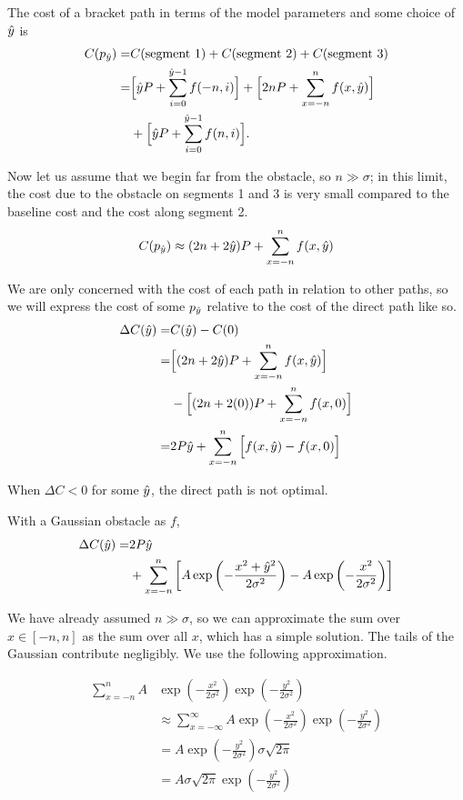 The cost of a bracket path in terms of the model parameters and some choice of $\hat{y}$ is 
\begin{align*}
C(p_{\hat{y}}) =& C(\text{segment 1}) + C(\text{segment 2}) + C(\text{segment 3}) \\
=&\Big[\hat{y} P + \sum\limits_{i=0}^{\hat{y}-1} f(-n, i) \Big] +
         \Big[2nP + \sum\limits_{x=-n}^{n}    f(x,\hat{y}) \Big]\\
     &+\Big[\hat{y} P + \sum\limits_{i=0}^{\hat{y}-1} f(n, i) \Big].
\end{align*}

Now let us assume that we begin far from the obstacle, so $n \gg \sigma$; in this limit, the cost due to the obstacle on segments 1 and 3 is very small compared to the baseline cost and the cost along segment 2.
\begin{equation}
C(p_{\hat{y}}) \approx (2n+2\hat{y})P +  \sum\limits_{x=-n}^{n} f(x,\hat{y})
\end{equation}

We are only concerned with the cost of each path in relation to other paths, so we will express the cost of some $p_{\hat{y}}$ relative to the cost of the direct path like so. 
\begin{align*}
\Delta C(\hat{y}) =& C(\hat{y})-C(0) \\
=& \Big[(2n+2\hat{y})P +  \sum\limits_{x=-n}^{n} f(x,\hat{y}) \Big] \\
 & - \Big[(2n+2(0))P +  \sum\limits_{x=-n}^{n} f(x,0) \Big] \\
=& 2P\hat{y} + \sum\limits_{x=-n}^{n} \Big[ f(x,\hat{y})-f(x,0) \Big]
\end{align*}

When $\Delta C < 0$ for some $\hat{y}$, the direct path is not optimal.

With a Gaussian obstacle as $f$,
\begin{align}
\Delta C(\hat{y}) = &2P\hat{y} \\
&+ \sum\limits_{x=-n}^{n} \left[A\exp\left(-\frac{x^2 + \hat{y}^2}{2\sigma^2}\right) - A\exp\left(-\frac{x^2}{2\sigma^2}\right) \right]\notag
\end{align}

We have already assumed $n \gg \sigma$, so we can approximate the sum over $x \in [-n, n]$ as the sum over all $x$, which has a simple solution. The tails of the Gaussian contribute negligibly. We use the following approximation. 

\begin{align*}
        \sum\limits_{x=-n}^{n} A&\exp\left(-\frac{x^2}{2\sigma^2}\right)\exp\left(-\frac{y^2}{2\sigma^2}\right) \\
&\approx \sum\limits_{x=-\infty}^{\infty} A\exp\left(-\frac{x^2}{2\sigma^2}\right)\exp\left(-\frac{y^2}{2\sigma^2}\right)  \\
&= A\exp\left(-\frac{y^2}{2\sigma^2}\right)\sigma\sqrt{2\pi} \\
&= A\sigma\sqrt{2\pi}\exp\left(-\frac{y^2}{2\sigma^2}\right)
\end{align*}

